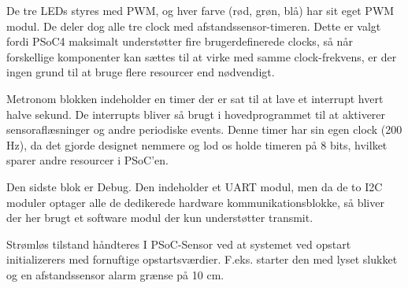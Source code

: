 De tre LEDs styres med PWM, og hver farve (rød, grøn, blå) har sit eget PWM modul. De deler dog alle tre clock med afstandssensor-timeren. Dette er valgt fordi PSoC4 maksimalt understøtter fire brugerdefinerede clocks, så når forskellige komponenter kan sættes til at virke med samme clock-frekvens, er der ingen grund til at bruge flere resourcer end nødvendigt.

Metronom blokken indeholder en timer der er sat til at lave et interrupt hvert halve sekund. De interrupts bliver så brugt i hovedprogrammet til at aktiverer sensoraflæsninger og andre periodiske events. Denne timer har sin egen clock (200 Hz), da det gjorde designet nemmere og lod os holde timeren på 8 bits, hvilket sparer andre resourcer i PSoC'en.

Den sidste blok er Debug. Den indeholder et UART modul, men da de to I2C moduler optager alle de dedikerede hardware kommunikationsblokke, så bliver der her brugt et software modul der kun understøtter transmit.

Strømløs tilstand håndteres I PSoC-Sensor ved at systemet ved opstart initializerers med fornuftige opstartsværdier. F.eks. starter den med lyset slukket og en afstandssensor alarm grænse på 10 cm.

